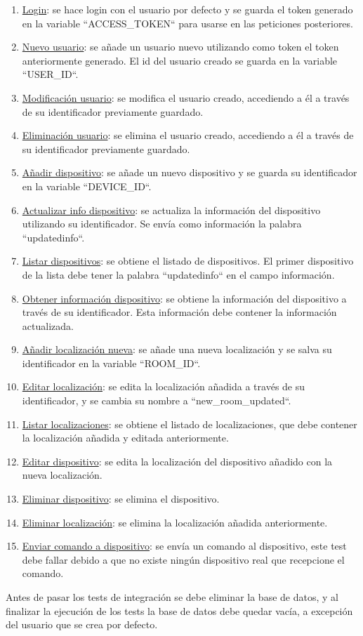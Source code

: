 \begin{enumerate}
\item\underline{Login}: se hace login con el usuario por defecto y se guarda el token generado en la variable ``ACCESS_TOKEN``
 para usarse en las peticiones posteriores.
\item\underline{Nuevo usuario}: se añade un usuario nuevo utilizando como token el token anteriormente generado. El id del usuario creado se
guarda en la variable ``USER_ID``.
\item\underline{Modificación usuario}: se modifica el usuario creado, accediendo a él a través de su identificador previamente guardado.
\item\underline{Eliminación usuario}: se elimina el usuario creado, accediendo a él a través de su identificador previamente guardado.
\item\underline{Añadir dispositivo}: se añade un nuevo dispositivo y se guarda su identificador en la variable ``DEVICE_ID``.
\item\underline{Actualizar info dispositivo}: se actualiza la información del dispositivo utilizando su identificador. Se envía como información
la palabra ``updatedinfo``.
\item\underline{Listar dispositivos}: se obtiene el listado de dispositivos. El primer dispositivo de la lista debe tener la palabra ``updatedinfo``
en el campo información.
\item\underline{Obtener información dispositivo}: se obtiene la información del dispositivo a través de su identificador. Esta información debe contener la información actualizada.
\item\underline{Añadir localización nueva}: se añade una nueva localización y se salva su identificador en la variable ``ROOM_ID``.
\item\underline{Editar localización}: se edita la localización añadida a través de su identificador, y se cambia su nombre a ``new_room_updated``.
\item\underline{Listar localizaciones}: se obtiene el listado de localizaciones, que debe contener la localización añadida y editada anteriormente.
\item\underline{Editar dispositivo}: se edita la localización del dispositivo añadido con la nueva localización.
\item\underline{Eliminar dispositivo}: se elimina el dispositivo.
\item\underline{Eliminar localización}: se elimina la localización añadida anteriormente.
\item\underline{Enviar comando a dispositivo}: se envía un comando al dispositivo, este test debe fallar debido a que no existe ningún dispositivo real que 
recepcione el comando.
\end{enumerate}

Antes de pasar los tests de integración se debe eliminar la base de datos, y al finalizar la ejecución de los tests la base de datos debe quedar vacía, a
excepción del usuario que se crea por defecto.

\label{sect:intecompletos}
 
